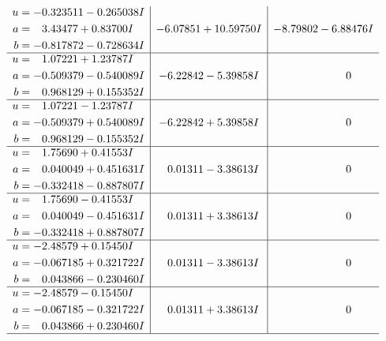 \documentclass[1p]{elsarticle_modified}
\theoremstyle{definition}
\begin{document}
$$\begin{array}{c|c|c}
\begin{aligned}
u &= -0.323511 - 0.265038 I \\
a &= \phantom{-}3.43477 + 0.83700 I \\
b &= -0.817872 - 0.728634 I\end{aligned}
 & -6.07851 + 10.59750 I & -8.79802 - 6.88476 I \\ \hline\begin{aligned}
u &= \phantom{-}1.07221 + 1.23787 I \\
a &= -0.509379 - 0.540089 I \\
b &= \phantom{-}0.968129 + 0.155352 I\end{aligned}
 & -6.22842 - 5.39858 I & \phantom{-0.000000 } 0 \\ \hline\begin{aligned}
u &= \phantom{-}1.07221 - 1.23787 I \\
a &= -0.509379 + 0.540089 I \\
b &= \phantom{-}0.968129 - 0.155352 I\end{aligned}
 & -6.22842 + 5.39858 I & \phantom{-0.000000 } 0 \\ \hline\begin{aligned}
u &= \phantom{-}1.75690 + 0.41553 I \\
a &= \phantom{-}0.040049 + 0.451631 I \\
b &= -0.332418 - 0.887807 I\end{aligned}
 & \phantom{-}0.01311 - 3.38613 I & \phantom{-0.000000 } 0 \\ \hline\begin{aligned}
u &= \phantom{-}1.75690 - 0.41553 I \\
a &= \phantom{-}0.040049 - 0.451631 I \\
b &= -0.332418 + 0.887807 I\end{aligned}
 & \phantom{-}0.01311 + 3.38613 I & \phantom{-0.000000 } 0 \\ \hline\begin{aligned}
u &= -2.48579 + 0.15450 I \\
a &= -0.067185 + 0.321722 I \\
b &= \phantom{-}0.043866 - 0.230460 I\end{aligned}
 & \phantom{-}0.01311 - 3.38613 I & \phantom{-0.000000 } 0 \\ \hline\begin{aligned}
u &= -2.48579 - 0.15450 I \\
a &= -0.067185 - 0.321722 I \\
b &= \phantom{-}0.043866 + 0.230460 I\end{aligned}
 & \phantom{-}0.01311 + 3.38613 I & \phantom{-0.000000 } 0\\
 \hline 
 \end{array}$$\newpage\newpage\renewcommand{\arraystretch}{1}
\end{document}
